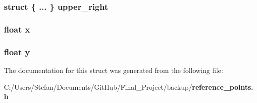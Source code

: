 \subsubsection[{upper\-\_\-right}]{\setlength{\rightskip}{0pt plus 5cm}struct \{ ... \}   upper\-\_\-right}\label{structreference_pos_a6ec7feed07606b23db971311d40ef1e6}
\subsubsection[{x}]{\setlength{\rightskip}{0pt plus 5cm}float x}\label{structreference_pos_ad0da36b2558901e21e7a30f6c227a45e}
\subsubsection[{y}]{\setlength{\rightskip}{0pt plus 5cm}float y}\label{structreference_pos_aa4f0d3eebc3c443f9be81bf48561a217}


The documentation for this struct was generated from the following file\-:\begin{DoxyCompactItemize}
\item 
C\-:/\-Users/\-Stefan/\-Documents/\-Git\-Hub/\-Final\-\_\-\-Project/backup/{\bf reference\-\_\-points.\-h}\end{DoxyCompactItemize}
